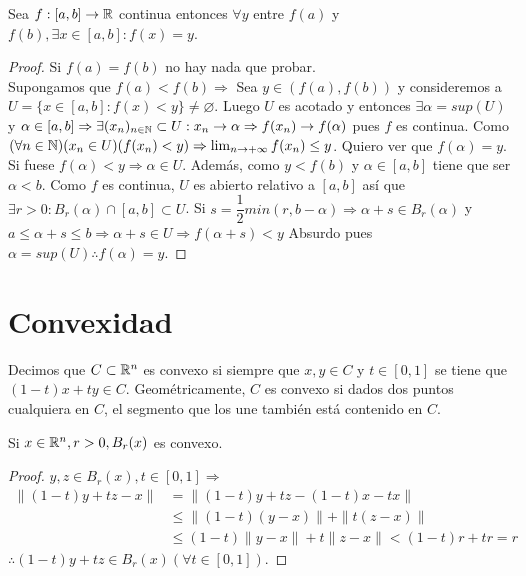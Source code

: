 \begin{theorem}
  Sea $f: [a, b] \to \mathbb{R}$ continua entonces $\forall y$ entre $f(a)$ y $f(b), \exists x \in [a, b] : f(x) = y$.

  \begin{proof}
    Si $f(a) = f(b)$ no hay nada que probar. \\
    Supongamos que $f(a) < f(b) \Rightarrow$ Sea $y \in (f(a), f(b))$ y consideremos a $U = \{ x \in [a, b] : f(x) < y \} \neq \varnothing$. Luego $U$ es acotado y entonces $\exists \alpha = sup(U)$ y $\alpha \in [a, b] \Rightarrow \exists (x_n)_{n \in \mathbb{N}} \subset U : x_n \to \alpha \Rightarrow f(x_n) \to f(\alpha)$ pues $f$ es continua. Como $(\forall n \in \mathbb{N})(x_n \in U)(f(x_n) < y) \Rightarrow \lim_{n \to +\infty} f(x_n) \leq y$. Quiero ver que $f(\alpha) = y$. Si fuese $f(\alpha) < y \Rightarrow \alpha \in U$. Además, como $y < f(b)$ y $\alpha \in [a, b]$ tiene que ser $\alpha < b$. Como $f$ es continua, $U$ es abierto relativo a $[a, b]$ así que $\exists r > 0 : B_r(\alpha) \cap [a, b] \subset U$. Si $s = \dfrac{1}{2} min(r, b-\alpha) \Rightarrow \alpha + s \in B_r(\alpha)$ y $a \leq \alpha + s \leq b \Rightarrow \alpha + s \in U \Rightarrow f(\alpha + s) < y$ Absurdo pues $\alpha = sup(U) \therefore f(\alpha) = y$.
  \end{proof}
\end{theorem}

\section{Convexidad}

\begin{definition}[Convexidad]
  Decimos que $C \subset \mathbb{R}^n$ es convexo si siempre que $x, y \in C$ y $t \in [0, 1]$ se tiene que $(1-t)x+ty \in C$. Geométricamente, $C$ es convexo si dados dos puntos cualquiera en $C$, el segmento que los une también está contenido en $C$.
\end{definition}

\begin{eg}
  Si $x \in \mathbb{R}^n, r > 0, B_r(x)$ es convexo.
  \begin{proof}
    $y, z \in B_r(x), t \in [0,1] \Rightarrow$ \begin{align*}
      \|(1-t)y+tz - x\| & = \| (1-t)y + tz - (1-t)x - tx \|                \\
                        & \leq \|(1 -t) (y-x) \| + \|t(z-x)\|              \\
                        & \leq (1-t) \|y-x\| + t \|z-x\| < (1-t)r + tr = r
    \end{align*} $\therefore (1-t)y + tz \in B_r(x) (\forall t \in [0, 1])$.
  \end{proof}
\end{eg}

